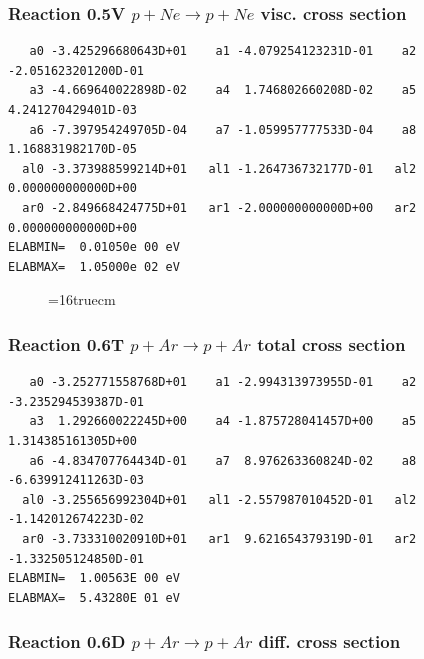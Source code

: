 \documentclass[12pt,dvips]{article}
\begin{document}
\subsubsection{
Reaction 0.5V   $ p + Ne \rightarrow p + Ne  $ visc. cross
section }


\begin{small}\begin{verbatim}
   a0 -3.425296680643D+01    a1 -4.079254123231D-01    a2 -2.051623201200D-01
   a3 -4.669640022898D-02    a4  1.746802660208D-02    a5  4.241270429401D-03
   a6 -7.397954249705D-04    a7 -1.059957777533D-04    a8  1.168831982170D-05
  al0 -3.373988599214D+01   al1 -1.264736732177D-01   al2  0.000000000000D+00
  ar0 -2.849668424775D+01   ar1 -2.000000000000D+00   ar2  0.000000000000D+00
ELABMIN=  0.01050e 00 eV
ELABMAX=  1.05000e 02 eV
\end{verbatim}\end{small}



\begin{figure} \label{0.5}
\epsfxsize=16truecm
\end{figure}
\newpage



\subsubsection{
Reaction 0.6T   $ p + Ar \rightarrow p + Ar $ total cross
section }



\begin{small}\begin{verbatim}
   a0 -3.252771558768D+01    a1 -2.994313973955D-01    a2 -3.235294539387D-01
   a3  1.292660022245D+00    a4 -1.875728041457D+00    a5  1.314385161305D+00
   a6 -4.834707764434D-01    a7  8.976263360824D-02    a8 -6.639912411263D-03
  al0 -3.255656992304D+01   al1 -2.557987010452D-01   al2 -1.142012674223D-02
  ar0 -3.733310020910D+01   ar1  9.621654379319D-01   ar2 -1.332505124850D-01
ELABMIN=  1.00563E 00 eV
ELABMAX=  5.43280E 01 eV
\end{verbatim}\end{small}

\subsubsection{
Reaction 0.6D    $p + Ar \rightarrow p + Ar  $ diff. cross
section }
\end{document}
